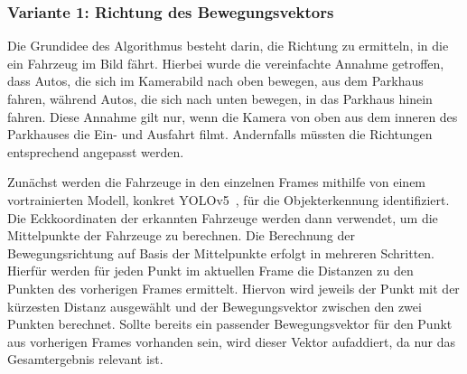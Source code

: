 \subsubsection{Variante 1: Richtung des Bewegungsvektors}\label{ch:Sensor_v1}

Die Grundidee des Algorithmus besteht darin, die Richtung zu ermitteln, in die ein Fahrzeug im Bild fährt.
Hierbei wurde die vereinfachte Annahme getroffen, dass Autos, die sich im Kamerabild nach oben bewegen, aus dem Parkhaus fahren, während Autos, die sich nach unten bewegen, in das Parkhaus hinein fahren.
Diese Annahme gilt nur, wenn die Kamera von oben aus dem inneren des Parkhauses die Ein- und Ausfahrt filmt.
Andernfalls müssten die Richtungen entsprechend angepasst werden.

Zunächst werden die Fahrzeuge in den einzelnen Frames mithilfe von einem vortrainierten Modell, konkret YOLOv5~\cite{yolov5}, für die Objekterkennung identifiziert.
Die Eckkoordinaten der erkannten Fahrzeuge werden dann verwendet, um die Mittelpunkte der Fahrzeuge zu berechnen.
Die Berechnung der Bewegungsrichtung auf Basis der Mittelpunkte erfolgt in mehreren Schritten.
Hierfür werden für jeden Punkt im aktuellen Frame die Distanzen zu den Punkten des vorherigen Frames ermittelt.
Hiervon wird jeweils der Punkt mit der kürzesten Distanz ausgewählt und der Bewegungsvektor zwischen den zwei Punkten berechnet.
Sollte bereits ein passender Bewegungsvektor für den Punkt aus vorherigen Frames vorhanden sein, wird dieser Vektor aufaddiert, da nur das Gesamtergebnis relevant ist.

